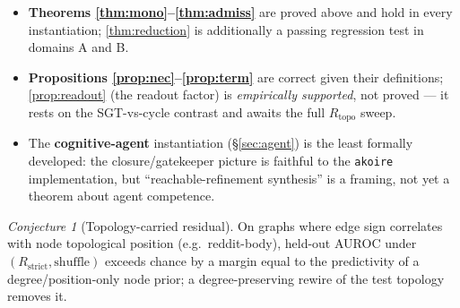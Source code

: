 \documentclass[11pt,a4paper]{article}
\theoremstyle{definition}
\theoremstyle{plain}
\theoremstyle{remark}
\newtheorem{conjecture}{Conjecture}
\newcommand{\Rstrict}{R_{\mathrm{strict}}}
\newcommand{\Rtopo}{R_{\mathrm{topo}}}
\begin{document}
\begin{itemize}
\item \textbf{Theorems \ref{thm:mono}--\ref{thm:admiss}} are proved above and hold
in every instantiation; \ref{thm:reduction} is additionally a passing regression
test in domains A and B.
\item \textbf{Propositions \ref{prop:nec}--\ref{prop:term}} are correct given
their definitions; \ref{prop:readout} (the readout factor) is
\emph{empirically supported}, not proved --- it rests on the SGT-vs-cycle
contrast and awaits the full $\Rtopo$ sweep.
\item The \textbf{cognitive-agent} instantiation (\S\ref{sec:agent}) is the least
formally developed: the closure/gatekeeper picture is faithful to the
\texttt{akoire} implementation, but ``reachable-refinement synthesis'' is a
framing, not yet a theorem about agent competence.
\end{itemize}

\begin{conjecture}[Topology-carried residual]
\label{conj:topo}
On graphs where edge sign correlates with node topological position
(e.g.\ reddit-body), held-out AUROC under $(\Rstrict,\text{shuffle})$ exceeds
chance by a margin equal to the predictivity of a degree/position-only node
prior; a degree-preserving rewire of the test topology removes it.
\end{conjecture}
\end{document}
